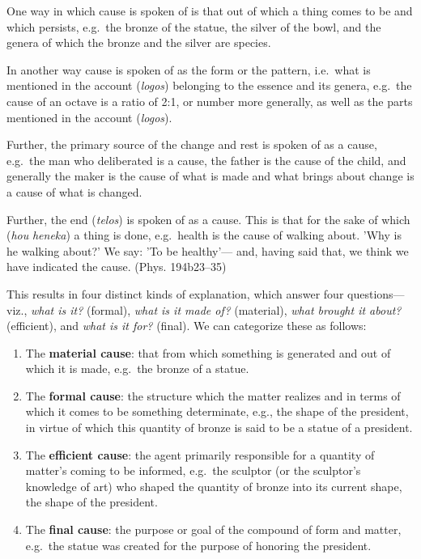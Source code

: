 \documentclass[12pt]{article}
\begin{document}
\begin{quote-b}
One way in which cause is spoken of is that out of which a thing comes to be and
which persists, e.g. the bronze of the statue, the silver of the bowl, and the
genera of which the bronze and the silver are species.

In another way cause is spoken of as the form or the pattern, i.e. what is
mentioned in the account (\emph{logos}) belonging to the essence and its genera, e.g. the
cause of an octave is a ratio of 2:1, or number more generally, as well as the
parts mentioned in the account (\emph{logos}).

Further, the primary source of the change and rest is spoken of as a cause,
e.g. the man who deliberated is a cause, the father is the cause of the child, and
generally the maker is the cause of what is made and what brings about change is a
cause of what is changed.

Further, the end (\emph{telos}) is spoken of as a cause. This is that for the sake of
which (\emph{hou} \emph{heneka}) a thing is done, e.g. health is the cause of walking about. 'Why
is he walking about?' We say: 'To be healthy'--- and, having said that, we think we
have indicated the cause. (Phys. 194b23--35)
\end{quote-b}

This results in four distinct kinds of explanation, which answer four
questions---viz., \emph{what is it?} (formal), \emph{what is it made of?} (material), \emph{what
brought it about?} (efficient), and \emph{what is it for?} (final). We can categorize
these as follows:

\begin{enumerate}
\item The \textbf{material cause}: that from which something is generated and out of which it is
made, e.g. the bronze of a statue.
\item The \textbf{formal cause}: the structure which the matter realizes and in terms of which it
comes to be something determinate, e.g., the shape of the president, in virtue of
which this quantity of bronze is said to be a statue of a president.
\item The \textbf{efficient cause}: the agent primarily responsible for a quantity of matter's
coming to be informed, e.g. the sculptor (or the sculptor's knowledge of art) who
shaped the quantity of bronze into its current shape, the shape of the president.
\item The \textbf{final cause}: the purpose or goal of the compound of form and matter, e.g. the
statue was created for the purpose of honoring the president.
\end{enumerate}
\end{document}
